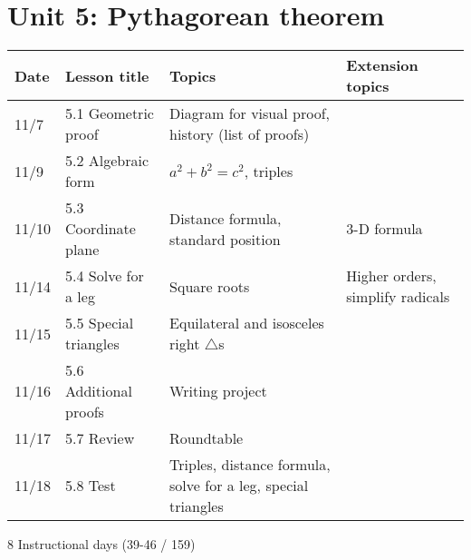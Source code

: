 \section*{Unit 5: Pythagorean theorem}
\begin{tabular}{|p{0.9cm}|p{4cm}|p{7cm}|p{5cm}|}
  \hline
  Date & Lesson title & Topics  & Extension topics \\
  \hline
  11/7 & 5.1 Geometric proof & Diagram for visual proof, history (list of proofs) &  \\
  \hline
  11/9 & 5.2 Algebraic form & $a^2+b^2=c^2$, triples &  \\
  \hline
  11/10 & 5.3 Coordinate plane & Distance formula, standard position & 3-D formula \\
  \hline
  11/14 & 5.4 Solve for a leg & Square roots & Higher orders, simplify radicals \\
  \hline
  11/15 & 5.5 Special triangles & Equilateral and isosceles right $\triangle$s &  \\
  \hline
  11/16 & 5.6 Additional proofs & Writing project & \\
  \hline
  11/17 & 5.7 Review & Roundtable &  \\
  \hline
  11/18 & 5.8 Test & Triples, distance formula, solve for a leg, special triangles & \\
  \hline

\end{tabular} \par \vspace*{0.3cm}
8 Instructional days (39-46 / 159)


